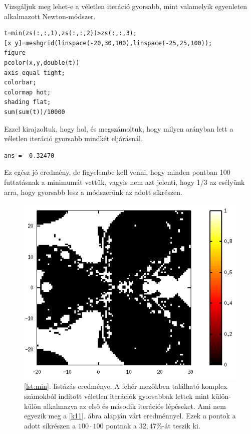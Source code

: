 \documentclass[a4paper,12pt]{report}
\begin{document}
				Vizsgáljuk meg lehet-e a véletlen iteráció gyorsabb, mint valamelyik egyenleten alkalmazott Newton-módszer.
				\begin{singlespace}
                \begin{lstlisting}[caption=Bemenet,label=lst:min]
t=min(zs(:,:,1),zs(:,:,2))>zs(:,:,3);
[x y]=meshgrid(linspace(-20,30,100),linspace(-25,25,100));
figure
pcolor(x,y,double(t))
axis equal tight;
colorbar;
colormap hot;
shading flat;
sum(sum(t))/10000
				\end{lstlisting}
                \end{singlespace}
				Ezzel kirajzoltuk, hogy hol, és megszámoltuk, hogy milyen arányban lett a véletlen iteráció gyorsabb mindkét eljárásnál.
				\begin{singlespace}
                \begin{lstlisting}[caption= Eredm\'eny]
ans =  0.32470
				\end{lstlisting}
                \end{singlespace}
				Ez egész jó eredmény, de figyelembe kell venni, hogy minden pontban 100 futtatásnak a minimumát vettük, vagyis nem azt jelenti, hogy 1/3 az esélyünk arra, hogy gyorsabb lesz a módszerünk az adott síkrészen.

				\begin{figure}[h]
					\centering
					\includegraphics[scale=0.35]{kepek/min.png}
					\caption{\ref{lst:min}. listázás eredménye. A fehér mezőkben található komplex számokból indított véletlen iterációk gyorsabbak lettek mint külön-külön alkalmazva az első és második iterációs lépéseket. Ami nem egyezik meg a \ref{k11}. ábra alapján várt eredménnyel. Ezek a pontok a adott síkrészen a $100\cdot100$ pontnak a $32,\!47\%$-át teszik ki.}
				\end{figure}
\end{document}
